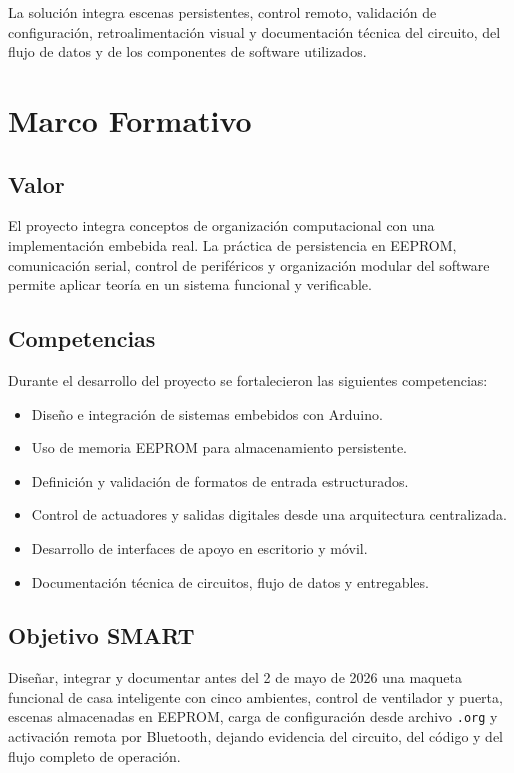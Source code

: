 \documentclass[12pt,a4paper]{article}
\begin{document}
La solución integra escenas persistentes, control remoto, validación de configuración, retroalimentación visual y documentación técnica del circuito, del flujo de datos y de los componentes de software utilizados.

\section{Marco Formativo}

\subsection{Valor}
El proyecto integra conceptos de organización computacional con una implementación embebida real. La práctica de persistencia en EEPROM, comunicación serial, control de periféricos y organización modular del software permite aplicar teoría en un sistema funcional y verificable.

\subsection{Competencias}
Durante el desarrollo del proyecto se fortalecieron las siguientes competencias:
\begin{itemize}[leftmargin=1.2cm]
    \item Diseño e integración de sistemas embebidos con Arduino.
    \item Uso de memoria EEPROM para almacenamiento persistente.
    \item Definición y validación de formatos de entrada estructurados.
    \item Control de actuadores y salidas digitales desde una arquitectura centralizada.
    \item Desarrollo de interfaces de apoyo en escritorio y móvil.
    \item Documentación técnica de circuitos, flujo de datos y entregables.
\end{itemize}

\subsection{Objetivo SMART}
Diseñar, integrar y documentar antes del 2 de mayo de 2026 una maqueta funcional de casa inteligente con cinco ambientes, control de ventilador y puerta, escenas almacenadas en EEPROM, carga de configuración desde archivo \texttt{.org} y activación remota por Bluetooth, dejando evidencia del circuito, del código y del flujo completo de operación.
\end{document}

